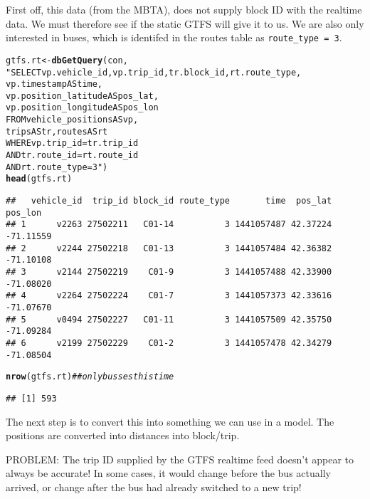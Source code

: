 \documentclass[10pt]{article}\usepackage[]{graphicx}\usepackage[]{color}
\makeatletter
\newcommand{\hlstr}[1]{\textcolor[rgb]{0.192,0.494,0.8}{#1}}%
\newcommand{\hlcom}[1]{\textcolor[rgb]{0.678,0.584,0.686}{\textit{#1}}}%
\newcommand{\hlstd}[1]{\textcolor[rgb]{0.345,0.345,0.345}{#1}}%
\newcommand{\hlkwb}[1]{\textcolor[rgb]{0.69,0.353,0.396}{#1}}%
\newcommand{\hlkwd}[1]{\textcolor[rgb]{0.737,0.353,0.396}{\textbf{#1}}}%
\newenvironment{kframe}{%
 \def\at@end@of@kframe{}%
 \ifinner\ifhmode%
  \def\at@end@of@kframe{\end{minipage}}%
  \begin{minipage}{\columnwidth}%
 \fi\fi%
 \def\FrameCommand##1{\hskip\@totalleftmargin \hskip-\fboxsep
 \colorbox{shadecolor}{##1}\hskip-\fboxsep
     \hskip-\linewidth \hskip-\@totalleftmargin \hskip\columnwidth}%
 \MakeFramed {\advance\hsize-\width
   \@totalleftmargin\z@ \linewidth\hsize
   \@setminipage}}%
 {\par\unskip\endMakeFramed%
 \at@end@of@kframe}
\newenvironment{knitrout}{}{} %
\makeatother
\begin{document}
First off, this data (from the MBTA), does not supply block ID with the realtime data.
We must therefore see if the static GTFS will give it to us.
We are also only interested in buses, which is identifed in the routes table as \texttt{route\_type = 3}.
\begin{knitrout}
\color{fgcolor}\begin{kframe}
\begin{alltt}
\hlstd{gtfs.rt} \hlkwb{<-} \hlkwd{dbGetQuery}\hlstd{(con,}
                      \hlstr{"SELECT vp.vehicle_id, vp.trip_id, tr.block_id, rt.route_type, 
                              vp.timestamp AS time, 
                              vp.position_latitude AS pos_lat, 
                              vp.position_longitude AS pos_lon 
                         FROM vehicle_positions AS vp, 
                              trips AS tr, routes AS rt 
                        WHERE vp.trip_id    = tr.trip_id 
                          AND tr.route_id   = rt.route_id 
                          AND rt.route_type = 3"}\hlstd{)}
\hlkwd{head}\hlstd{(gtfs.rt)}
\end{alltt}
\begin{verbatim}
##   vehicle_id  trip_id block_id route_type       time  pos_lat   pos_lon
## 1      v2263 27502211   C01-14          3 1441057487 42.37224 -71.11559
## 2      v2244 27502218   C01-13          3 1441057484 42.36382 -71.10108
## 3      v2144 27502219    C01-9          3 1441057488 42.33900 -71.08020
## 4      v2264 27502224    C01-7          3 1441057373 42.33616 -71.07670
## 5      v0494 27502227   C01-11          3 1441057509 42.35750 -71.09284
## 6      v2199 27502229    C01-2          3 1441057478 42.34279 -71.08504
\end{verbatim}
\begin{alltt}
\hlkwd{nrow}\hlstd{(gtfs.rt)} \hlcom{## only busses this time}
\end{alltt}
\begin{verbatim}
## [1] 593
\end{verbatim}
\end{kframe}
\end{knitrout}
The next step is to convert this into something we can use in a model.
The positions are converted into distances into block/trip.

PROBLEM: The trip ID supplied by the GTFS realtime feed doesn't appear to always be
accurate! In some cases, it would change before the bus actually arrived, or change after
the bus had already switched to a new trip!
\end{document}
